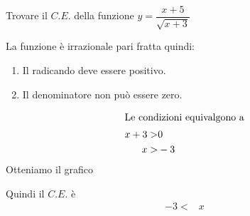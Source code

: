 		Trovare il $C.E.$ della funzione $y=\dfrac{x+5}{\sqrt{x+3}}$
	
	La funzione è irrazionale pari fratta quindi:
	\begin{enumerate}
		\item Il radicando deve essere positivo.
		\item Il denominatore non può essere zero.
	\end{enumerate}
	\begin{align*}
	\intertext{Le condizioni equivalgono a}
	x+3>&0\\
	x>&-3
	\end{align*}
	Otteniamo il grafico
	\begin{center}
		
	\end{center}
	Quindi il $C.E.$ è
	\begin{align*}
	-3<& x
	\end{align*}
	
